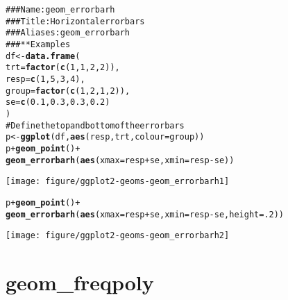 \documentclass[a4paper,titlepage]{tufte-handout}\usepackage{graphicx, color}
\makeatletter
\def\maxwidth{ %
  \ifdim\Gin@nat@width>\linewidth
    \linewidth
  \else
    \Gin@nat@width
  \fi
}
\newcommand{\hlfunctioncall}[1]{\textcolor[rgb]{0.501960784313725,0,0.329411764705882}{\textbf{#1}}}%
\newcommand{\hlcomment}[1]{\textcolor[rgb]{0.180392156862745,0.6,0.341176470588235}{#1}}%
\newenvironment{kframe}{%
 \def\at@end@of@kframe{}%
 \ifinner\ifhmode%
  \def\at@end@of@kframe{\end{minipage}}%
  \begin{minipage}{\columnwidth}%
 \fi\fi%
 \def\FrameCommand##1{\hskip\@totalleftmargin \hskip-\fboxsep
 \colorbox{shadecolor}{##1}\hskip-\fboxsep
     \hskip-\linewidth \hskip-\@totalleftmargin \hskip\columnwidth}%
 \MakeFramed {\advance\hsize-\width
   \@totalleftmargin\z@ \linewidth\hsize
   \@setminipage}}%
 {\par\unskip\endMakeFramed%
 \at@end@of@kframe}
\newenvironment{knitrout}{}{} %
\makeatother
\begin{document}
\begin{knitrout}
\color{fgcolor}\begin{kframe}
\begin{alltt}
\hlcomment{### Name: geom_errorbarh}
\hlcomment{### Title: Horizontal error bars}
\hlcomment{### Aliases: geom_errorbarh}
\hlcomment{### ** Examples}
df <- \hlfunctioncall{data.frame}(
  trt = \hlfunctioncall{factor}(\hlfunctioncall{c}(1, 1, 2, 2)),
  resp = \hlfunctioncall{c}(1, 5, 3, 4),
  group = \hlfunctioncall{factor}(\hlfunctioncall{c}(1, 2, 1, 2)),
  se = \hlfunctioncall{c}(0.1, 0.3, 0.3, 0.2)
)
\hlcomment{# Define the top and bottom of the errorbars}
p <- \hlfunctioncall{ggplot}(df, \hlfunctioncall{aes}(resp, trt, colour = group))
p + \hlfunctioncall{geom_point}() +
  \hlfunctioncall{geom_errorbarh}(\hlfunctioncall{aes}(xmax = resp + se, xmin = resp - se))
\end{alltt}
\end{kframe}\texttt{[image: figure/ggplot2-geoms-geom\_errorbarh1]} \begin{kframe}\begin{alltt}
p + \hlfunctioncall{geom_point}() +
  \hlfunctioncall{geom_errorbarh}(\hlfunctioncall{aes}(xmax = resp + se, xmin = resp - se, height = .2))
\end{alltt}
\end{kframe}\texttt{[image: figure/ggplot2-geoms-geom\_errorbarh2]} 
\end{knitrout}


\section{geom\_freqpoly}
\end{document}

